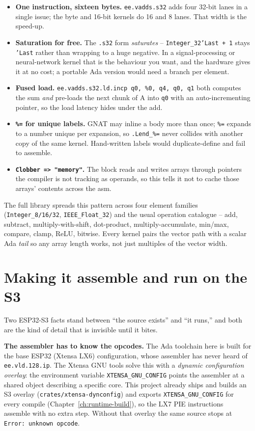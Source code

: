 \begin{itemize}
\item \textbf{One instruction, sixteen bytes.} \texttt{ee.vadds.s32} adds four
  32-bit lanes in a single issue; the byte and 16-bit kernels do 16 and 8 lanes.
  That width is the speed-up.
\item \textbf{Saturation for free.} The \texttt{.s32} form \emph{saturates} --
  \texttt{Integer\_32'Last + 1} stays \texttt{'Last} rather than wrapping to a huge
  negative. In a signal-processing or neural-network kernel that is the behaviour you
  want, and the hardware gives it at no cost; a portable Ada version would need a
  branch per element.
\item \textbf{Fused load. } \texttt{ee.vadds.s32.ld.incp q0, \%0, q4, q0, q1}
  both computes the sum \emph{and} pre-loads the next chunk of A into \texttt{q0}
  with an auto-incrementing pointer, so the load latency hides under the add.
\item \textbf{\texttt{\%=} for unique labels.} GNAT may inline a body more than once;
  \texttt{\%=} expands to a number unique per expansion, so \texttt{.Lend\_\%=}
  never collides with another copy of the same kernel. Hand-written labels would
  duplicate-define and fail to assemble.
\item \textbf{\texttt{Clobber => "memory"}.} The block reads and writes arrays
  through pointers the compiler is not tracking as operands, so this tells it not to
  cache those arrays' contents across the asm.
\end{itemize}

The full library spreads this pattern across four element families
(\texttt{Integer\_8/16/32}, \texttt{IEEE\_Float\_32}) and the usual operation
catalogue -- add, subtract, multiply-with-shift, dot-product, multiply-accumulate,
min/max, compare, clamp, ReLU, bitwise. Every kernel pairs the vector path with a
scalar Ada \emph{tail} so any array length works, not just multiples of the vector
width.

\section{Making it assemble and run on the S3}

Two ESP32-S3 facts stand between ``the source exists'' and ``it runs,'' and both are
the kind of detail that is invisible until it bites.

\textbf{The assembler has to know the opcodes.} The Ada toolchain here is built for
the base ESP32 (Xtensa LX6) configuration, whose assembler has never heard of
\texttt{ee.vld.128.ip}. The Xtensa GNU tools solve this with a \emph{dynamic
configuration overlay}: the environment variable \texttt{XTENSA\_GNU\_CONFIG} points
the assembler at a shared object describing a specific core. This project already
ships and builds an S3 overlay (\texttt{crates/xtensa-dynconfig}) and exports
\texttt{XTENSA\_GNU\_CONFIG} for every compile (Chapter~\ref{ch:runtime-build}), so
the LX7 PIE instructions assemble with no extra step. Without that overlay the same
source stops at \texttt{Error: unknown opcode}.

